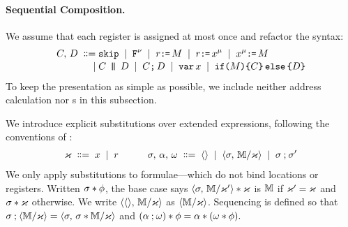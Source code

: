 \paragraph{Sequential Composition.}
We assume that each register is assigned at most once and refactor the syntax:
\begin{align*}
  C,\,D
  \;\mathrel{\mathord{\vcentcolon}\mkern-1mu\mathord{\vcentcolon}\mathord{{=}}}\;& \texttt{skip}
  \;\mathrel{|}\; \texttt{F}^{\nu}
  \;\mathrel{|}\; r\texttt{:}\mkern-1mu\texttt{=}\,M
  \;\mathrel{|}\; r\texttt{:}\mkern-1mu\texttt{=}\,x^{\mu} 
  \;\mathrel{|}\; x^{\mu}\texttt{:}\mkern-1mu\texttt{=}\,M
  \\[-.5ex]
  \;\mathrel{|}\;&C \,\mathbin{\texttt{|}\mkern-6mu\texttt{|}}\, D
  \;\mathrel{|}\;C \texttt{;}\,\allowbreak D
  \;\mathrel{|}\; \texttt{var}\,x
  \;\mathrel{|}\; \texttt{if}\allowbreak\texttt{(}M\texttt{)} \allowbreak\texttt{\{} C \texttt{\}}\,\allowbreak\texttt{else}\allowbreak\,\texttt{\{} D \texttt{\}}
\end{align*}
To keep the presentation as simple as possible, we include neither
address calculation nor \RMW{}s in this subsection.


We introduce explicit substitutions over extended expressions,
following the conventions of \citet{DBLP:conf/icalp/RitterP97}: 
\begin{gather*}
  \varkappa\;\mathrel{\mathord{\vcentcolon}\mkern-1mu\mathord{\vcentcolon}\mathord{{=}}}\; x \;\mathrel{|}\; r
  \qquad\quad
  \sigma,\,\alpha,\,\omega\;\mathrel{\mathord{\vcentcolon}\mkern-1mu\mathord{\vcentcolon}\mathord{{=}}}\; \langle\rangle \;\mathrel{|}\; \langle\sigma,\,\mathbb{M}/\varkappa\rangle
  \;\mathrel{|}\; \sigma\mathbin{;}\sigma'
\end{gather*}
We only apply substitutions to formulae---which
do not bind locations or registers. Written $\sigma\mathbin{\ast}\phi$, the
base case says
\begin{math}
  \langle\sigma,\,\mathbb{M}/\varkappa'\rangle\mathbin{\ast}\varkappa
\end{math}
is $\mathbb{M}$ if $\varkappa'=\varkappa$ and $\sigma \mathbin{\ast}\varkappa$ otherwise.
We write $\langle\langle\rangle,\,\mathbb{M}/\varkappa\rangle$ as $\langle\mathbb{M}/\varkappa\rangle$.
Sequencing is defined so that
\begin{math}
  \sigma\mathbin{;}\langle\mathbb{M}/\varkappa\rangle
  \allowbreak= 
  \langle\sigma,\,\sigma\mathbin{\ast}\mathbb{M}/\varkappa\rangle
\end{math}
and
\begin{math}
  (\alpha\mathbin{;}\omega)\mathbin{\ast}\phi = \alpha\mathbin{\ast}(\omega\mathbin{\ast}\phi).
\end{math}

